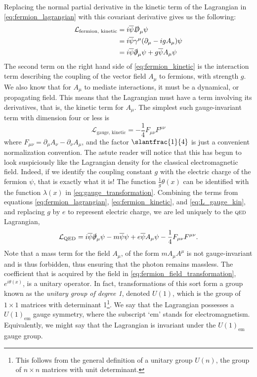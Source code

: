 Replacing the normal partial derivative in the kinetic term of the Lagrangian in \autoref{eq:fermion_lagrangian} with this covariant derivative gives us the following: 
\begin{equation}\label{eq:fermion_kinetic}
    \begin{split}
  \mathcal{L}_\text{fermion, kinetic} &= i\overline{\psi}\slashed{D}_\mu\psi\\
&= i\overline{\psi}\gamma^\mu(\partial_\mu-igA_\mu)\psi\\
&= i\overline{\psi}\slashed{\partial}_\mu\psi + g\overline{\psi}A_\mu\psi
\end{split}
\end{equation}
The second term on the right hand side of \autoref{eq:fermion_kinetic} is the interaction term describing the coupling of the vector field $A_\mu$ to fermions, with strength $g$. We also know that for $A_\mu$ to mediate interactions, it must be a dynamical, or propagating field. This means that the Lagrangian must have a term involving its derivatives, that is, the kinetic term for $A_\mu$. The simplest such gauge-invariant term with dimension four or less is %
%
\begin{equation}\label{eq:L_gauge_kin}
\mathcal{L}_\text{gauge, kinetic} = -\frac{1}{4}F_{\mu\nu}F^{\mu\nu}
\end{equation}
%
where $F_{\mu\nu} = \partial_\mu A_\nu - \partial_\nu A_\mu$, and the factor $\slantfrac{1}{4}$ is just a convenient normalization convention. The astute reader will notice that this has begun to look suspiciously like the Lagrangian density for the classical electromagnetic field. Indeed, if we identify the coupling constant $g$ with the electric charge of the fermion $\psi$, that is exactly what it is! The function $\frac{1}{g} \theta(x)$ can be identified with the function $\lambda(x)$ in \autoref{eq:gauge_transformation}. Combining the terms from equations \ref{eq:fermion_lagrangian}, \ref{eq:fermion_kinetic}, and \ref{eq:L_gauge_kin}, and replacing $g$ by $e$ to represent electric charge, we are led uniquely to the \textsc{qed} Lagrangian,
\begin{equation}
  \mathcal{L}_\text{QED} = i\overline{\psi}\slashed{\partial}_\mu\psi - m\overline{\psi}\psi + e\overline{\psi}A_\mu\psi -\frac{1}{4}F_{\mu\nu}F^{\mu\nu}.
\end{equation}
Note that a mass term for the field $A_\mu$, of the form $mA_\mu A^\mu$ is not gauge-invariant and is thus forbidden, thus ensuring that the photon remains massless.
The coefficient that is acquired by the field in \autoref{eq:fermion_field_transformation}, $e^{i\theta(x)}$, is a unitary operator. In fact, transformations of this sort form a group known as the \emph{unitary group of degree 1}, denoted $U(1)$, which is the group of $1\times 1$ matrices with determinant 1\footnote{This follows from the general definition of a unitary group $U(n)$, the group of $n\times n$ matrices with unit determinant.}. We say that the Lagrangian possesses a $U(1)_\text{em}$ gauge symmetry, where the subscript `em' stands for electromagnetism. Equivalently, we might say that the Lagrangian is invariant under the $U(1)_\text{em}$ gauge group. 

